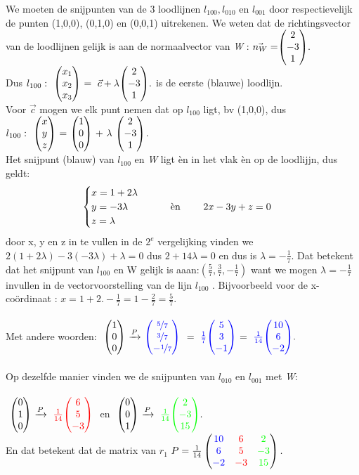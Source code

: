 \documentclass[hidelinks, a4wide, 12pt,  twoside]{book}
\begin{document}
We moeten  de snijpunten van de 3 loodlijnen $ l_{100}, l_{010} $ en $ l_{001}  $ door respectievelijk de punten (1,0,0), (0,1,0) en (0,0,1) uitrekenen. We weten dat de richtingsvector van de loodlijnen gelijk is aan de normaalvector van \textit{W} : $\vec{n_W} = \vecdrie{2}{-3}{1}. $ \\ 
Dus  $ l_{100}: \ \ \vecdriesnel{x} \ = \  \vec{c} + \lambda \vecdrie{2}{-3}{1}. $ is de eerste (blauwe) loodlijn. \\
Voor $ \vec{c} $ mogen we elk punt  nemen dat op  $ l_{100} $ ligt, bv  (1,0,0), dus
$ l_{100}: \ \ \vecdrie{x}{y}{z} \ = \ \vecdrie{1}{0}{0} \ + \ \lambda \ \vecdrie{2}{-3}{1} $. \\ 
Het snijpunt (blauw) van $ l_{100} $ en\textit{ W}  ligt èn in het vlak  èn op de loodlijjn, dus geldt:
\[\begin{cases}
    x = 1 + 2\lambda  \\
    y= -3\lambda   \qquad \qquad $ èn $ \qquad  2x-3y+z = 0 \\
    z= \lambda 
\end{cases}
\] 
door x, y en z in te  vullen in de $ 2^e $  vergelijking vinden we 
$  2(1 + 2\lambda) - 3 (-3\lambda) + \lambda = 0 $   dus  
$ 2+ 14\lambda  = 0 $ en dus is $  \lambda = -\frac{1}{7}   $. Dat betekent dat het snijpunt van $ l_{100} $ en W gelijk is aaan:$  (\frac{5}{7}, \frac{3}{7}, -\frac{1}{7} )  $   want we mogen $\lambda = -\frac{1}{7} $ invullen in  de vectorvoorstelling van de lijn $ l_{100} $ . Bijvoorbeeld voor  de x-coördinaat : $ x= 1+2. -\frac{1}{7}  = 1 -\frac{2}{7}  =  \frac{5}{7}.  $ \\ \\
Met andere woorden:
$ \ \vecdrie{1}{0}{0}   \  \xrightarrow{P}  \  \vecdrie[blue] {\nicefrac{5}{7} }{\nicefrac{3}{7} }{-\nicefrac{1}{7} }\ 
\ = \   \blu{\frac{1}{7} } \vecdrie[blue] {5}{3}{-1}
\ = \   \blu{\frac{1}{14} } \vecdrie[blue] {10}{6}{-2}. $  \\  \\
Op dezelfde manier vinden we de snijpunten van $ l_{010} $ en  $ l_{001}  $ met  
\textit{W}: \\ \\
$ \ \vecdrie{0}{1}{0}   \  \xrightarrow{P}  \ \red{\frac{1}{14} }  \vecdrie[red]{ 6 }{5 }{-3 }\ $ 
en \quad  
$  \ \vecdrie{0}{0}{1}   \  \xrightarrow{P}  \  \gre{\frac{1}{14} } \vecdrie[green]{2 }{-3 }{15}. $  \\
En dat betekent dat de matrix van $  r_1 $
$ P = 
\frac{1}{14} \begin{pmatrix}   {\color{blue}10} &  {\color{red}6} &   {\color{green}2}  \\    {\color{blue}6}   &   {\color{red}5} &  {\color{green}-3}  \\   {\color{blue}-2} &   {\color{red}-3}  &   {\color{green}15} \end{pmatrix}. $
\end{document}
